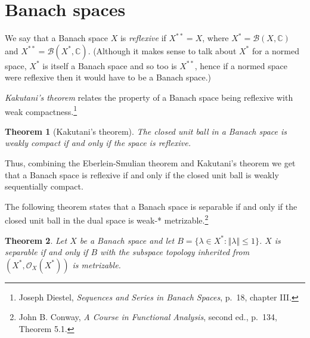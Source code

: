 \documentclass{article}
\newcommand{\norm}[1]{\left\Vert #1 \right\Vert}
\newtheorem{theorem}{Theorem}
\begin{document}
\section{Banach spaces}
We say that a Banach   space $X$ is {\em reflexive} if $X^{**}=X$, where $X^*=\mathscr{B}(X,\mathbb{C})$
and $X^{**}=\mathscr{B}(X^*, \mathbb{C})$. (Although it makes sense to talk about $X^*$ for a normed space, $X^*$ is itself a Banach space
and so too is $X^{**}$, hence if a normed space were reflexive then it would have to be a Banach space.)


 {\em Kakutani's theorem} relates the property of a Banach space being reflexive with
weak compactness.\footnote{Joseph Diestel,
{\em Sequences and Series in Banach Spaces}, p.~18, chapter III.}


\begin{theorem}[Kakutani's theorem]
The closed unit ball in a Banach space is weakly compact if and only if the space is reflexive.
\end{theorem}

Thus, combining the Eberlein-Smulian theorem and Kakutani's theorem we get that a Banach space is reflexive if and only if the closed unit ball is weakly
sequentially compact.


The following theorem states that a Banach space is separable if and only if the closed unit ball in the dual space is weak-* metrizable.\footnote{
John B. Conway, {\em A Course in Functional Analysis}, second ed., p.~134, Theorem 5.1.}
 
 \begin{theorem}
 Let $X$ be a Banach space and let $B=\{\lambda \in X^*: \norm{\lambda} \leq 1\}$. $X$ is separable if and only if $B$ with the subspace topology inherited
 from $(X^*,\mathcal{O}_X(X^*))$ is metrizable.
 \end{theorem}
\end{document}
